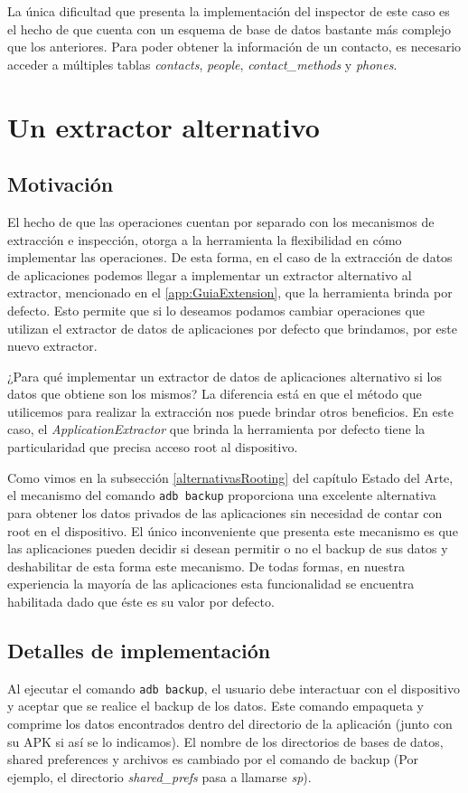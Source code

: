 La única dificultad que presenta la implementación del inspector de este caso es el hecho de que cuenta con un esquema de base de datos bastante más complejo que los anteriores. Para poder obtener la información de un contacto, es necesario acceder a múltiples tablas \emph{contacts}, \emph{people}, \emph{contact\_methods} y \emph{phones}.

\section{Un extractor alternativo}
\subsection{Motivación}
El hecho de que las operaciones cuentan por separado con los mecanismos de extracción e inspección, otorga a la herramienta la flexibilidad en cómo implementar las operaciones. De esta forma, en el caso de la extracción de datos de aplicaciones podemos llegar a implementar un extractor alternativo al extractor, mencionado en el \autoref{app:GuiaExtension}, que la herramienta brinda por defecto. Esto permite que si lo deseamos podamos cambiar operaciones que utilizan el extractor de datos de aplicaciones por defecto que brindamos, por este nuevo extractor.

¿Para qué implementar un extractor de datos de aplicaciones alternativo si los datos que obtiene son los mismos? La diferencia está en que el método que utilicemos para realizar la extracción nos puede brindar otros beneficios. En este caso, el \emph{ApplicationExtractor} que brinda la herramienta por defecto tiene la particularidad que precisa acceso root al dispositivo.

Como vimos en la subsección \ref{alternativasRooting} del capítulo Estado del Arte, el mecanismo del comando \texttt{adb backup} proporciona una excelente alternativa para obtener los datos privados de las aplicaciones sin necesidad de contar con root en el dispositivo. El único inconveniente que presenta este mecanismo es que las aplicaciones pueden decidir si desean permitir o no el backup de sus datos y deshabilitar de esta forma este mecanismo. De todas formas, en nuestra experiencia la mayoría de las aplicaciones esta funcionalidad se encuentra habilitada dado que éste es su valor por defecto.

\subsection{Detalles de implementación}
Al ejecutar el comando \texttt{adb backup}, el usuario debe interactuar con el dispositivo y aceptar que se realice el backup de los datos. Este comando empaqueta y comprime los datos encontrados dentro del directorio de la aplicación (junto con su APK si así se lo indicamos). El nombre de los directorios de bases de datos, shared preferences y archivos es cambiado por el comando de backup (Por ejemplo, el directorio \emph{shared\_prefs} pasa a llamarse \emph{sp}).

